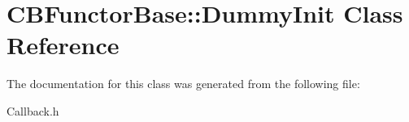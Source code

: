 \section{C\+B\+Functor\+Base\+:\+:Dummy\+Init Class Reference}
\label{classCBFunctorBase_1_1DummyInit}


The documentation for this class was generated from the following file\+:\begin{DoxyCompactItemize}
\item 
Callback.\+h\end{DoxyCompactItemize}
